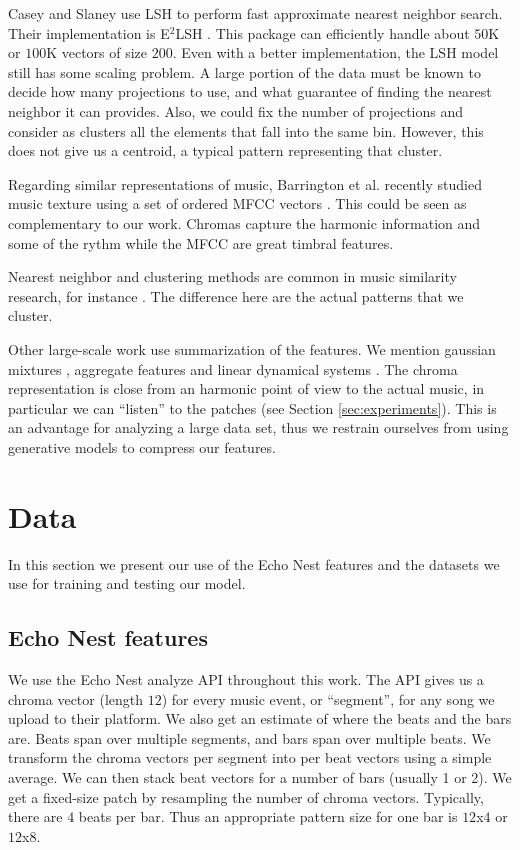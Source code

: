 \documentclass{article}
\begin{document}
Casey and Slaney \cite{Casey2006} use LSH \cite{Datar2004} to perform
fast approximate nearest neighbor search. Their implementation is E$^2$LSH
\cite{E2LSH}. This package can efficiently handle about $50$K or $100$K
vectors of size $200$. Even with a better implementation, the LSH
model still has some scaling problem. A large portion of the data
must be known to decide how many projections to use, and what guarantee
of finding the nearest neighbor it can provides. Also, we could fix the
number of projections and consider as clusters all the elements that
fall into the same bin. However, this does not give us a centroid, a
typical pattern representing that cluster.

Regarding similar representations of music,
Barrington et al. recently studied music texture using a set of ordered
MFCC vectors \cite{Barrington2009a}. This could be seen as complementary
to our work. Chromas capture the harmonic information and some of the
rythm while the MFCC are great timbral features.

Nearest neighbor and clustering methods are common in music similarity 
research, for instance \cite{Cano2004,Holzapfel2009}. The difference here 
are the actual patterns that we cluster.

Other large-scale work use summarization of the features. We mention 
gaussian mixtures \cite{Mandel2005}, aggregate features \cite{Bergstra2006a}
and linear dynamical systems \cite{Barrington2009a}. The chroma representation
is close from an harmonic point of view to the actual music, in particular
we can ``listen'' to the patches (see Section \ref{sec:experiments}).
This is an advantage for analyzing a large data set, thus
we restrain ourselves from using generative models to compress our features.


\section{Data}\label{sec:data}
In this section we present our use of the Echo Nest features and the
datasets we use for training and testing our model.


\subsection{Echo Nest features}
We use the Echo Nest analyze API \cite{EchoNest} throughout this work.
The API gives us a chroma vector (length $12$) for every music event, 
or ``segment'', for any song we upload to their platform. 
We also get an estimate of where the beats and the bars are. Beats span over
multiple segments, and bars span over multiple beats. 
We transform the chroma vectors per segment into per beat vectors using a 
simple average. We can then stack beat vectors for a number of bars 
(usually 1 or 2). 
We get a fixed-size patch by resampling the number of chroma vectors. Typically,
there are $4$ beats per bar. Thus an appropriate pattern size for one bar
is $12$x$4$ or $12$x$8$.
\end{document}
